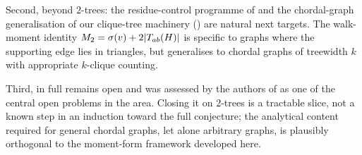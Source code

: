 Second, beyond $2$-trees: the residue-control programme of
\cite[\S 8]{AKMPZ2025} and the chordal-graph generalisation of our
clique-tree machinery () are
natural next targets. The walk-moment identity
$M_{2} = \sigma(v) + 2|T_{ab}(H)|$ is specific to graphs where
the supporting edge lies in triangles, but generalises to chordal
graphs of treewidth $k$ with appropriate $k$-clique counting.

Third,  in full remains open and was assessed by the
authors of \cite{AKMPZ2025} as one of the central open problems in the
area. Closing it on $2$-trees is a tractable slice, not a known step
in an induction toward the full conjecture; the analytical content
required for general chordal graphs, let alone arbitrary graphs, is
plausibly orthogonal to the moment-form framework developed here.

